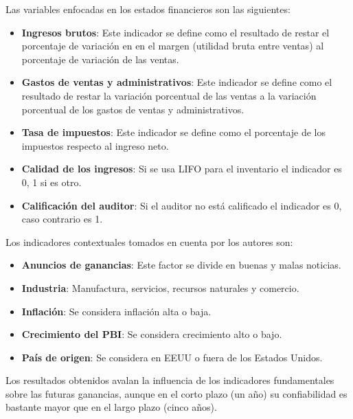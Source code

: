 Las variables enfocadas en los estados financieros son las siguientes:

\begin{itemize}

\item \textbf{Ingresos brutos}: Este indicador se define como el resultado de restar el porcentaje de variación en en el margen (utilidad bruta entre ventas) al porcentaje de variación de las ventas.

\item \textbf{Gastos de ventas y administrativos}: Este indicador se define como el resultado de restar la variación porcentual de las ventas a la variación porcentual de los gastos de ventas y administrativos.

\item \textbf{Tasa de impuestos}: Este indicador se define como el porcentaje de los impuestos respecto al ingreso neto.

\item \textbf{Calidad de los ingresos}: Si se usa LIFO para el inventario el indicador es 0, 1 si es otro.

\item \textbf{Calificación del auditor}: Si el auditor no está calificado el indicador es 0, caso contrario es 1.
\end{itemize}

Los indicadores contextuales tomados en cuenta por los autores son:\\

\begin{itemize}

\item \textbf{Anuncios de ganancias}: Este factor se divide en buenas y malas noticias.

\item \textbf{Industria}: Manufactura, servicios, recursos naturales y comercio.

\item \textbf{Inflación}: Se considera inflación alta o baja.

\item \textbf{Crecimiento del PBI}: Se considera crecimiento alto o bajo.

\item \textbf{País de origen}: Se considera en EEUU o fuera de los Estados Unidos.

\end{itemize}

Los resultados obtenidos avalan la influencia de los indicadores fundamentales sobre las futuras ganancias, aunque en el corto plazo (un año) su confiabilidad es bastante mayor que en el largo plazo (cinco años).\\


